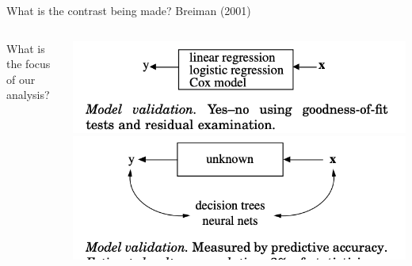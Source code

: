 \documentclass[notes,11pt, aspectratio=169]{beamer}
\newenvironment{wideitemize}{\itemize\addtolength{\itemsep}{10pt}}{\enditemize}
\begin{document}
\begin{frame}{What is the contrast being made? Breiman (2001)}
    \begin{columns}[onlytextwidth, T] %
      \begin{column}{.5\textwidth}
        \begin{wideitemize}
          \item What is the focus of our analysis?
        \end{wideitemize}
      \end{column}%
      \hfill%
      \begin{column}{.5\textwidth}
        \includegraphics[width=\linewidth]{images/breiman_box1.png}
        \includegraphics[width=\linewidth]{images/breiman_box2.png}        
      \end{column}%
    \end{columns}
\end{frame}
\end{document}
